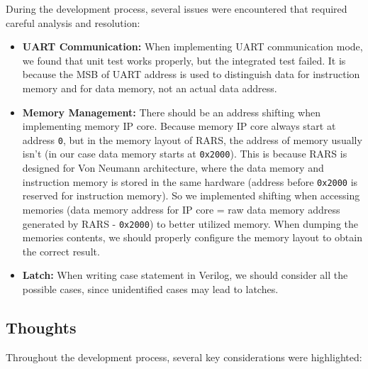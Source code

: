\documentclass[a4paper,12pt]{article}
\begin{document}
During the development process, several issues were encountered that required careful analysis and resolution:

\begin{itemize}
    
    \item \textbf{UART Communication:} When implementing UART communication mode, we found that unit test works properly, but the integrated test failed. It is because the MSB of UART address is used to distinguish data for instruction memory and for data memory, not an actual data address.
    
    \item \textbf{Memory Management:} There should be an address shifting when implementing memory IP core. Because memory IP core always start at address \texttt{0}, but in the memory layout of RARS, the address of memory usually isn't (in our case data memory starts at \texttt{0x2000}). This is because RARS is designed for Von Neumann architecture, where the data memory and instruction memory is stored in the same hardware (address before \texttt{0x2000} is reserved for instruction memory). So we implemented shifting when accessing memories (data memory address for IP core = raw data memory address generated by RARS - \texttt{0x2000}) to better utilized memory. When dumping the memories contents, we should properly configure the memory layout to obtain the correct result.

    \item \textbf{Latch:} When writing case statement in Verilog, we should consider all the possible cases, since unidentified cases may lead to latches.

\end{itemize}

\subsection{Thoughts}

Throughout the development process, several key considerations were highlighted:
\end{document}
